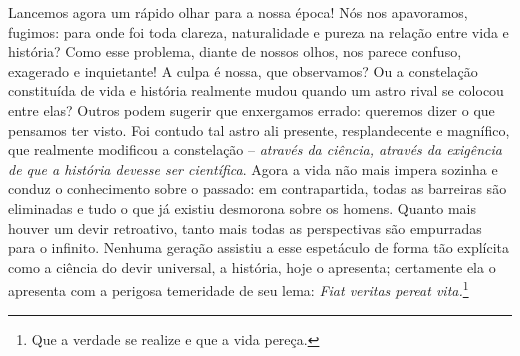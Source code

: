     Lancemos agora um rápido olhar para a nossa época! Nós nos
    apavoramos, fugimos: para onde foi toda clareza, naturalidade e
    pureza na relação entre vida e história? Como esse problema, diante
    de nossos olhos, nos parece confuso, exagerado e inquietante! A
    culpa é nossa, que observamos? Ou a constelação constituída de vida
    e história realmente mudou quando um astro rival se colocou entre
    elas? Outros podem sugerir que enxergamos errado: queremos dizer o
    que pensamos ter visto. Foi contudo tal astro ali presente,
    resplandecente e magnífico, que realmente modificou a constelação --
    \emph{através da ciência, através da exigência de que a história
    devesse ser científica}. Agora a vida não mais impera sozinha e
    conduz o conhecimento sobre o passado: em contrapartida, todas as
    barreiras são eliminadas e tudo o que já existiu desmorona sobre os
    homens. Quanto mais houver um devir retroativo, tanto mais todas as
    perspectivas são empurradas para o infinito. Nenhuma geração
    assistiu a esse espetáculo de forma tão explícita como a ciência do
    devir universal, a história, hoje o apresenta; certamente ela o
    apresenta com a perigosa temeridade de seu lema: \emph{Fiat veritas
    pereat vita.}\footnote{Que a verdade se realize e que a vida pereça.}

